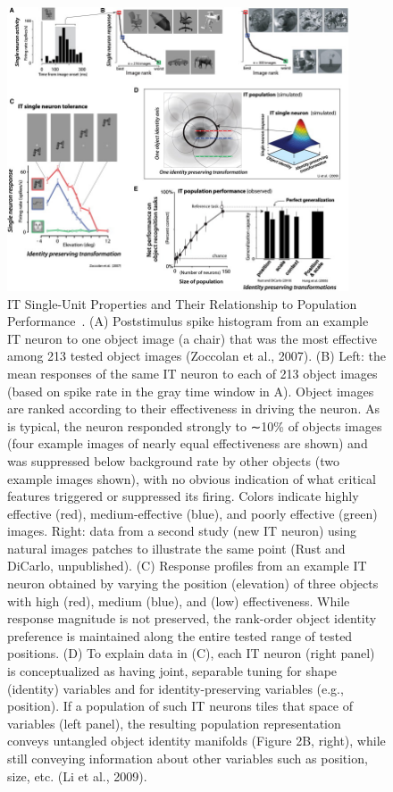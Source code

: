 \begin{figure}
	\centering
	\includegraphics[width=0.9\textwidth]{pics/IT.jpg}
	\caption{	
	IT Single-Unit Properties and Their Relationship to Population Performance~\cite{dicarlo2012does}.
	(A) Poststimulus spike histogram from an example IT neuron to one object image (a chair) that was the most effective among 213 tested object images (Zoccolan et al., 2007).
	(B) Left: the mean responses of the same IT neuron to each of 213 object images (based on spike rate in the gray time window in A). Object images are ranked according to their effectiveness in driving the neuron. As is typical, the neuron responded strongly to ∼10\% of objects images (four example images of nearly equal effectiveness are shown) and was suppressed below background rate by other objects (two example images shown), with no obvious indication of what critical features triggered or suppressed its firing. Colors indicate highly effective (red), medium-effective (blue), and poorly effective (green) images. Right: data from a second study (new IT neuron) using natural images patches to illustrate the same point (Rust and DiCarlo, unpublished).
	(C) Response profiles from an example IT neuron obtained by varying the position (elevation) of three objects with high (red), medium (blue), and (low) effectiveness. While response magnitude is not preserved, the rank-order object identity preference is maintained along the entire tested range of tested positions.
	(D) To explain data in (C), each IT neuron (right panel) is conceptualized as having joint, separable tuning for shape (identity) variables and for identity-preserving variables (e.g., position). If a population of such IT neurons tiles that space of variables (left panel), the resulting population representation conveys untangled object identity manifolds (Figure 2B, right), while still conveying information about other variables such as position, size, etc. (Li et al., 2009).
}
\end{figure}
